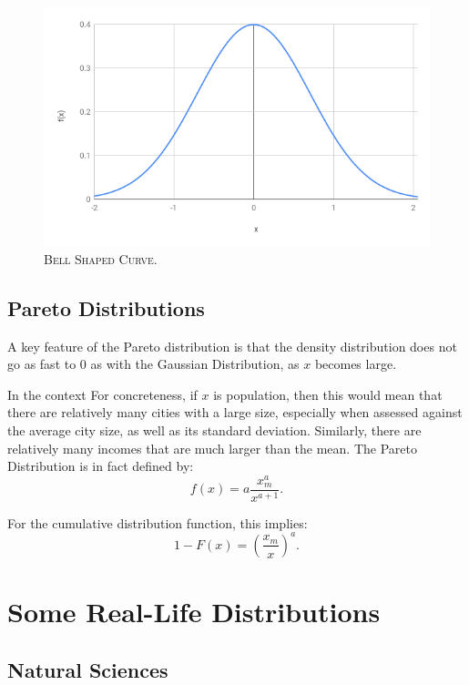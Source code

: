 \documentclass[]{book}
\theoremstyle{definition}
\theoremstyle{definition}
\theoremstyle{definition}
\theoremstyle{remark}
\begin{document}
\begin{figure}

{\centering \includegraphics[width=1\linewidth]{figures/bell-shaped} 

}

\caption{\textsc{Bell Shaped Curve}.}\label{fig:bell-shaped}
\end{figure}

\subsection{Pareto Distributions}\label{pareto}

A key feature of the Pareto distribution is that the density
distribution does not go as fast to \(0\) as with the Gaussian
Distribution, as \(x\) becomes large.

In the context For concreteness, if \(x\) is population, then this would
mean that there are relatively many cities with a large size, especially
when assessed against the average city size, as well as its standard
deviation. Similarly, there are relatively many incomes that are much
larger than the mean. The Pareto Distribution is in fact defined by:
\[f(x)=a\frac{x_m^a}{x^{a+1}}.\]

For the cumulative distribution function, this implies:
\[1-F(x)=\left(\frac{x_m}{x}\right)^a.\]

\section{Some Real-Life
Distributions}\label{some-real-life-distributions}

\subsection{Natural Sciences}\label{natural-sciences}
\end{document}
